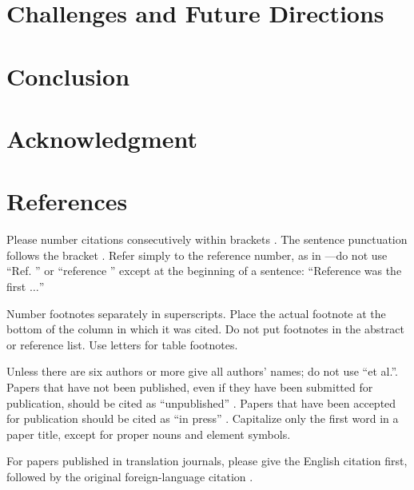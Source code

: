 \documentclass[conference]{IEEEtran}
\begin{document}
\section{Challenges and Future Directions}


\section{Conclusion}


\section*{Acknowledgment}

\section*{References}

Please number citations consecutively within brackets \cite{firstbib}. The
sentence punctuation follows the bracket \cite{b2}. Refer simply to the
reference number, as in \cite{b3}---do not use ``Ref. \cite{b3}'' or
``reference \cite{b3}'' except at the beginning of a sentence: ``Reference
\cite{b3} was the first $\ldots$''

Number footnotes separately in superscripts. Place the actual footnote at the
bottom of the column in which it was cited. Do not put footnotes in the
abstract or reference list. Use letters for table footnotes.

Unless there are six authors or more give all authors' names; do not use ``et
al.''. Papers that have not been published, even if they have been submitted
for publication, should be cited as ``unpublished'' \cite{b4}. Papers that have
been accepted for publication should be cited as ``in press'' \cite{b5}.
Capitalize only the first word in a paper title, except for proper nouns and
element symbols.

For papers published in translation journals, please give the English citation
first, followed by the original foreign-language citation \cite{b6}.
\end{document}
